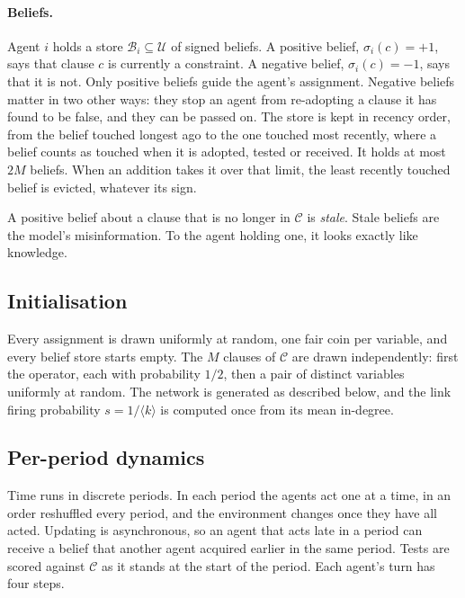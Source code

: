 \documentclass[11pt]{article}
\begin{document}
\paragraph{Beliefs.} Agent $i$ holds a store $\mathcal{B}_i \subseteq \mathcal{U}$ of signed beliefs. A positive belief, $\sigma_i(c) = +1$, says that clause $c$ is currently a constraint. A negative belief, $\sigma_i(c) = -1$, says that it is not. Only positive beliefs guide the agent's assignment. Negative beliefs matter in two other ways: they stop an agent from re-adopting a clause it has found to be false, and they can be passed on. The store is kept in recency order, from the belief touched longest ago to the one touched most recently, where a belief counts as touched when it is adopted, tested or received. It holds at most $2M$ beliefs. When an addition takes it over that limit, the least recently touched belief is evicted, whatever its sign.

A positive belief about a clause that is no longer in $\mathcal{C}$ is \emph{stale}. Stale beliefs are the model's misinformation. To the agent holding one, it looks exactly like knowledge.

\subsection{Initialisation}

Every assignment is drawn uniformly at random, one fair coin per variable, and every belief store starts empty. The $M$ clauses of $\mathcal{C}$ are drawn independently: first the operator, each with probability $1/2$, then a pair of distinct variables uniformly at random. The network is generated as described below, and the link firing probability $s = 1/\langle k\rangle$ is computed once from its mean in-degree.

\subsection{Per-period dynamics}

Time runs in discrete periods. In each period the agents act one at a time, in an order reshuffled every period, and the environment changes once they have all acted. Updating is asynchronous, so an agent that acts late in a period can receive a belief that another agent acquired earlier in the same period. Tests are scored against $\mathcal{C}$ as it stands at the start of the period. Each agent's turn has four steps.
\end{document}
